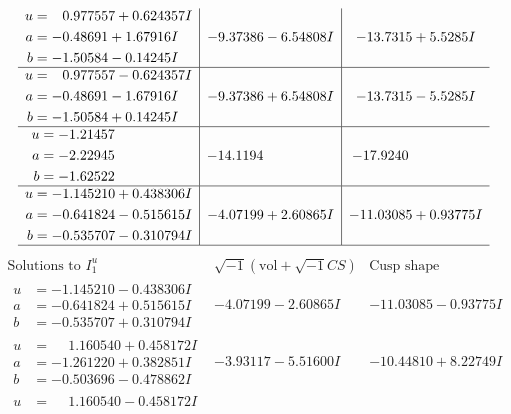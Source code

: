 \documentclass[1p]{elsarticle_modified}
\theoremstyle{definition}
\newcommand{\I}{\sqrt{-1}}
\begin{document}
$$\begin{array}{c|c|c}
\begin{aligned}
u &= \phantom{-}0.977557 + 0.624357 I \\
a &= -0.48691 + 1.67916 I \\
b &= -1.50584 - 0.14245 I\end{aligned}
 & -9.37386 - 6.54808 I & -13.7315 + 5.5285 I \\ \hline\begin{aligned}
u &= \phantom{-}0.977557 - 0.624357 I \\
a &= -0.48691 - 1.67916 I \\
b &= -1.50584 + 0.14245 I\end{aligned}
 & -9.37386 + 6.54808 I & -13.7315 - 5.5285 I \\ \hline\begin{aligned}
u &= -1.21457\phantom{ +0.000000I} \\
a &= -2.22945\phantom{ +0.000000I} \\
b &= -1.62522\phantom{ +0.000000I}\end{aligned}
 & -14.1194\phantom{ +0.000000I} & -17.9240\phantom{ +0.000000I} \\ \hline\begin{aligned}
u &= -1.145210 + 0.438306 I \\
a &= -0.641824 - 0.515615 I \\
b &= -0.535707 - 0.310794 I\end{aligned}
 & -4.07199 + 2.60865 I & -11.03085 + 0.93775 I\\
 \hline 
 \end{array}$$\newpage$$\begin{array}{c|c|c}  
\text{Solutions to }I^u_{1}& \I (\text{vol} + \sqrt{-1}CS) & \text{Cusp shape}\\
 \hline 
\begin{aligned}
u &= -1.145210 - 0.438306 I \\
a &= -0.641824 + 0.515615 I \\
b &= -0.535707 + 0.310794 I\end{aligned}
 & -4.07199 - 2.60865 I & -11.03085 - 0.93775 I \\ \hline\begin{aligned}
u &= \phantom{-}1.160540 + 0.458172 I \\
a &= -1.261220 + 0.382851 I \\
b &= -0.503696 - 0.478862 I\end{aligned}
 & -3.93117 - 5.51600 I & -10.44810 + 8.22749 I \\ \hline\begin{aligned}
u &= \phantom{-}1.160540 - 0.458172 I \\

\end{aligned}
\end{array}$$
\end{document}
